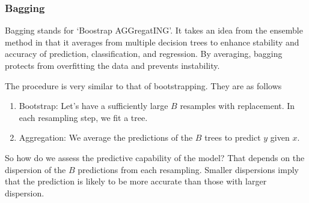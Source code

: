 \documentclass[12pt]{article}
\theoremstyle{definition}
\theoremstyle{property}
\theoremstyle{assumption}
\theoremstyle{example}
\theoremstyle{comment}
\begin{document}
\subsubsection{Bagging}
Bagging stands for `Boostrap AGGregatING'. It takes an idea from the ensemble method in that it averages from multiple decision trees to enhance stability and accuracy of prediction, classification, and regression. By averaging, bagging protects from overfitting the data and prevents instability. 
\par
The procedure is very similar to that of bootstrapping. They are as follows
\begin{enumerate}
\item Bootstrap: Let's have a sufficiently large $B$ resamples with replacement. In each resampling step, we fit a tree.
\item Aggregation: We average the predictions of the $B$ trees to predict $y$ given $x$. 
\end{enumerate}
So how do we assess the predictive capability of the model? That depends on the dispersion of the $B$ predictions from each resampling. Smaller dispersions imply that the prediction is likely to be more accurate than those with larger dispersion. 
\end{document}
